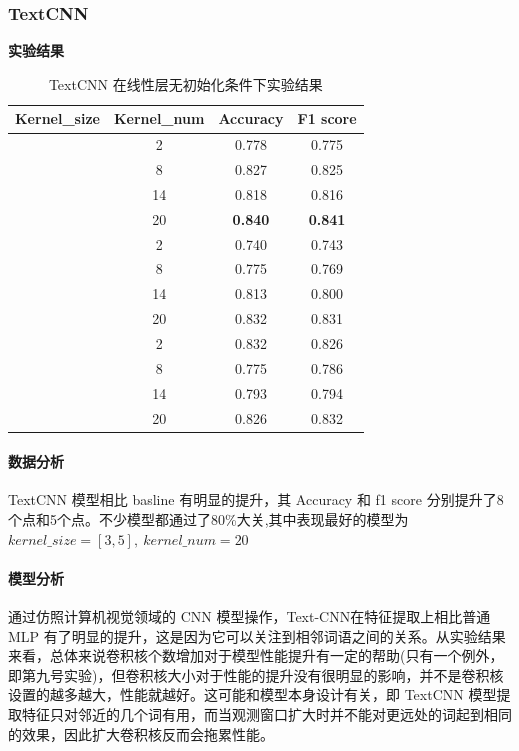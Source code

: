 \documentclass{article}
\begin{document}
\begin{spacing}{1.1}
		\subsubsection{TextCNN}
			\textbf{实验结果}
			
			\begin{table}[h]
				\center
				\begin{tabular}{c|c|c|c}
					\textbf{Kernel\_size} & \textbf{Kernel\_num} & \textbf{Accuracy} & \textbf{F1 score} \\
					\hline
					[3,5] & 2 & 0.778 & 0.775 \\
					\hline
					[3,5] & 8 & 0.827 & 0.825\\
					\hline
					[3,5] & 14 & 0.818 & 0.816 \\
					\hline
					[3,5] & 20 & \textbf{0.840} & \textbf{0.841} \\
					\hline
					[3,5,7] & 2 & 0.740 & 0.743\\
					\hline
					[3,5,7] & 8 & 0.775 & 0.769 \\
					\hline
					[3,5,7] & 14 & 0.813 & 0.800 \\
					\hline
					[3,5,7] & 20 & 0.832 & 0.831\\
					\hline
					[3,5,7,9] & 2 & 0.832 & 0.826 \\
					\hline
					[3,5,7,9] & 8 & 0.775 & 0.786 \\
					\hline
					[3,5,7,9] & 14 & 0.793 & 0.794 \\
					\hline
					[3,5,7,9] & 20 & 0.826 & 0.832 \\
				\end{tabular}
				\caption{TextCNN 在线性层无初始化条件下实验结果}
			\end{table}
		
		
		\paragraph*{数据分析}
			TextCNN 模型相比 basline 有明显的提升，其 Accuracy 和 f1 score 分别提升了8个点和5个点。不少模型都通过了80\%大关,其中表现最好的模型为$kernel\_size = [3,5],\ kernel\_num = 20$
		\paragraph*{模型分析}
			通过仿照计算机视觉领域的 CNN 模型操作，Text-CNN在特征提取上相比普通 MLP 有了明显的提升，这是因为它可以关注到相邻词语之间的关系。从实验结果来看，总体来说卷积核个数增加对于模型性能提升有一定的帮助(只有一个例外，即第九号实验)，但卷积核大小对于性能的提升没有很明显的影响，并不是卷积核设置的越多越大，性能就越好。这可能和模型本身设计有关，即 TextCNN 模型提取特征只对邻近的几个词有用，而当观测窗口扩大时并不能对更远处的词起到相同的效果，因此扩大卷积核反而会拖累性能。
			

\end{spacing}
\end{document}
